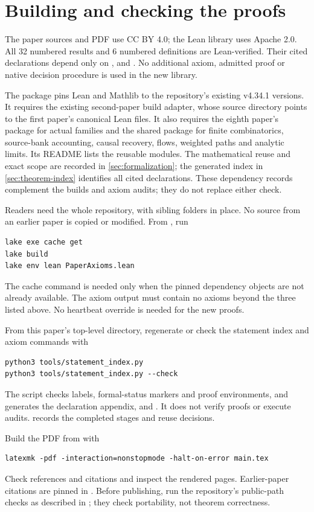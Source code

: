 \section{Building and checking the proofs}\label{sec:verification}

The paper sources and PDF use CC BY 4.0; the Lean library uses Apache 2.0.
All 32 numbered results and 6 numbered definitions
are Lean-verified. Their cited
declarations depend only on ,
 and .
No additional axiom, admitted proof or native decision procedure is
used in the new library.

The package pins Lean and Mathlib to the repository's existing v4.34.1
versions. It requires the existing second-paper build adapter, whose
source directory points to the first paper's canonical Lean files.
It also requires the eighth paper's  package for
actual families and the shared  package for finite
combinatorics, source-bank accounting, causal recovery, flows, weighted
paths and analytic limits. Its README lists the reusable modules.
The mathematical reuse and exact scope are recorded in
\cref{sec:formalization}; the generated index in \cref{sec:theorem-index}
identifies all cited declarations. These dependency records complement
the builds and axiom audits; they do not replace either check.

Readers need the whole repository, with sibling folders in place.
No source from an earlier paper is copied or modified. From , run
\begin{samepage}
\begin{verbatim}
lake exe cache get
lake build
lake env lean PaperAxioms.lean
\end{verbatim}
\end{samepage}
The cache command is needed only when the pinned dependency objects
are not already available. The axiom output must contain no axioms
beyond the three listed above. No heartbeat override is needed for
the new proofs.

\begin{samepage}
From this paper's top-level directory, regenerate or check the statement
index and axiom commands with
\begin{verbatim}
python3 tools/statement_index.py
python3 tools/statement_index.py --check
\end{verbatim}
\end{samepage}
The script checks labels, formal-status markers and proof environments,
and generates the declaration appendix,  and
. It does not verify proofs or execute audits.
 records the completed stages and reuse decisions.

Build the PDF from  with
\begin{verbatim}
latexmk -pdf -interaction=nonstopmode -halt-on-error main.tex
\end{verbatim}
Check references and citations and inspect the rendered pages. Earlier-paper
citations are pinned in . Before publishing,
run the repository's public-path checks as described in
; they check portability, not theorem correctness.
